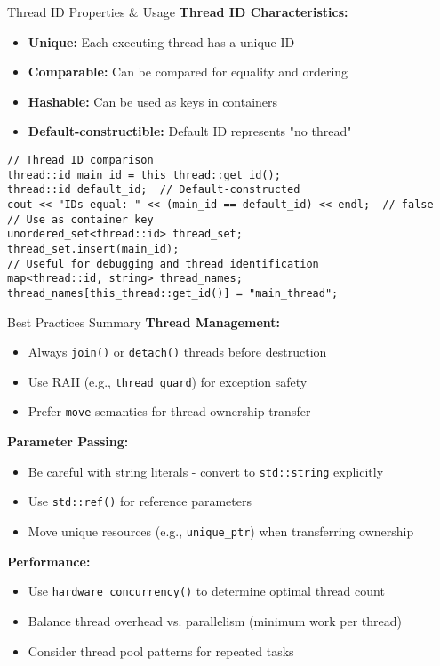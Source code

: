 \begin{frame}[fragile]{Thread ID Properties \& Usage}
	\textbf{Thread ID Characteristics:}
	\begin{itemize}
		\item \textbf{Unique:} Each executing thread has a unique ID
		\item \textbf{Comparable:} Can be compared for equality and ordering
		\item \textbf{Hashable:} Can be used as keys in containers
		\item \textbf{Default-constructible:} Default ID represents "no thread"
	\end{itemize}

	\begin{verbatim}
// Thread ID comparison
thread::id main_id = this_thread::get_id();
thread::id default_id;  // Default-constructed
cout << "IDs equal: " << (main_id == default_id) << endl;  // false
// Use as container key
unordered_set<thread::id> thread_set;
thread_set.insert(main_id);
// Useful for debugging and thread identification
map<thread::id, string> thread_names;
thread_names[this_thread::get_id()] = "main_thread";
	\end{verbatim}
\end{frame}

\begin{frame}[fragile]{ Best Practices Summary}
    \scriptsize
	\textbf{Thread Management:}
	\begin{itemize}
		\item Always \texttt{join()} or \texttt{detach()} threads before destruction
		\item Use RAII (e.g., \texttt{thread\_guard}) for exception safety
		\item Prefer \texttt{move} semantics for thread ownership transfer
	\end{itemize}

	\textbf{Parameter Passing:}
	\begin{itemize}
		\item Be careful with string literals - convert to \texttt{std::string} explicitly
		\item Use \texttt{std::ref()} for reference parameters
		\item Move unique resources (e.g., \texttt{unique\_ptr}) when transferring ownership
	\end{itemize}

	\textbf{Performance:}
	\begin{itemize}
		\item Use \texttt{hardware\_concurrency()} to determine optimal thread count
		\item Balance thread overhead vs. parallelism (minimum work per thread)
		\item Consider thread pool patterns for repeated tasks
	\end{itemize}
\end{frame}

